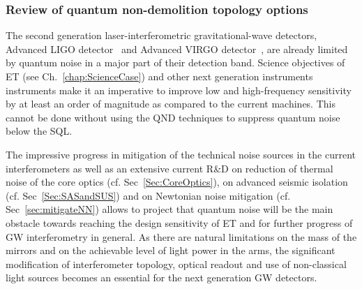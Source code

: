 
\subsubsection{Review of quantum non-demolition topology options}
\label{subsec:qndopt}

The second generation laser-interferometric gravitational-wave detectors, Advanced LIGO detector~\cite{TheLIGOScientific:2014jea} and Advanced VIRGO detector~\cite{TheVirgo:2014hva}, are already limited by quantum noise in a major part of their detection band. Science objectives of ET (see Ch.~\ref{chap:ScienceCase}) and other next generation instruments instruments make it an imperative to improve low and high-frequency sensitivity by at least an order of magnitude as compared to the current machines. This cannot be done without using the QND techniques to suppress quantum noise below the SQL.

The impressive progress in mitigation of the technical noise sources in the current interferometers as well as an extensive current R\&D on reduction of thermal noise of the core optics (cf. Sec~\ref{Sec:CoreOptics}), on advanced seismic isolation (cf. Sec~\ref{Sec:SASandSUS}) and on Newtonian noise mitigation (cf. Sec~\ref{sec:mitigateNN}) allows to project that quantum noise will be the main obstacle towards reaching the design sensitivity of ET and  for further progress of GW interferometry in general. As there are natural limitations on the mass of the mirrors and on the achievable level of light power in the arms, the significant modification of interferometer topology, optical readout and use of non-classical light sources becomes an essential for the next generation GW detectors.

